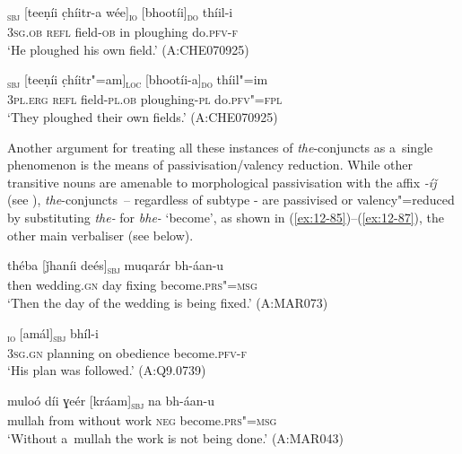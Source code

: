 \begin{exe}
\ex
\label{ex:12-83}
\gll [tíi]\textsubscript{\textsc{sbj}} [teeṇíi c̣híitr-a wée]\textsubscript{\textsc{io}} [bhootíi]\textsubscript{\textsc{do}} thíil-i  \\
\textsc{3sg.ob} \textsc{refl} field-\textsc{ob} in ploughing do.\textsc{pfv-f} \\
\glt `He ploughed his own field.' (A:CHE070925)
\end{exe}
\begin{exe}
\ex
\label{ex:12-84}
\gll [taním]\textsubscript{\textsc{sbj}} [teeṇíi c̣híitr"=am]\textsubscript{\textsc{loc}} [bhootíi-a]\textsubscript{\textsc{do}} thíil"=im  \\
\textsc{3pl.erg} \textsc{refl} field-\textsc{pl.ob} ploughing-\textsc{pl} do.\textsc{pfv"=fpl} \\
\glt `They ploughed their own fields.' (A:CHE070925)
\end{exe}

Another argument for treating all these instances of \textit{the}-conjuncts as a~single phenomenon is the means of passivisation/valency reduction. While other transitive nouns are amenable to morphological passivisation with the affix \textit{-íǰ} (see ), \textit{the}-conjuncts~-- regardless of subtype - are passivised or valency"=reduced by substituting \textit{the-} for \textit{bhe-} `become', as shown in (\ref{ex:12-85})--(\ref{ex:12-87}), the other main verbaliser (see below).

\begin{exe}
\ex
\label{ex:12-85}
\gll théba [ǰhaníi deés]\textsubscript{\textsc{sbj}} muqarár bh-áan-u  \\
then wedding.\textsc{gn} day fixing become.\textsc{prs"=msg} \\
\glt `Then the day of the wedding is being fixed.' (A:MAR073)
\end{exe}
\begin{exe}
\ex
\label{ex:12-86}
\textsubscript{\textsc{io}}
     [amál]\textsubscript{\textsc{sbj}} bhíl-i  \\
\textsc{3sg.gn} planning on obedience become.\textsc{pfv-f} \\
\glt `His plan was followed.' (A:Q9.0739)
\end{exe}
\begin{exe}
\ex
\label{ex:12-87}
\gll muloó díi ɣeér [kráam]\textsubscript{\textsc{sbj}} na bh-áan-u  \\
mullah from without work \textsc{neg} become.\textsc{prs"=msg} \\
\glt `Without a~mullah the work is not being done.' (A:MAR043)
\end{exe}

